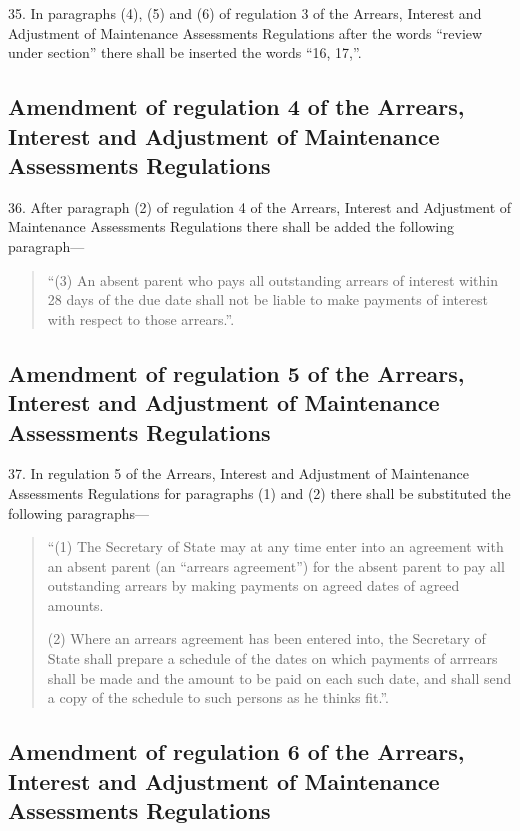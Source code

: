 \documentclass[a4paper]{article}
\begin{document}
35.  In paragraphs (4), (5) and (6) of regulation 3 of the Arrears, Interest and Adjustment of Maintenance Assessments Regulations after the words “review under section” there shall be inserted the words “16, 17,”.

\subsection[36. Amendment of regulation 4 of the Arrears, Interest and Adjustment of Maintenance Assessments Regulations]{Amendment of regulation 4 of the Arrears, Interest and Adjustment of Maintenance Assessments Regulations}

36.  After paragraph (2) of regulation 4 of the Arrears, Interest and Adjustment of Maintenance Assessments Regulations there shall be added the following paragraph---
\begin{quotation}
“(3) An absent parent who pays all outstanding arrears of interest within 28 days of the due date shall not be liable to make payments of interest with respect to those arrears.”.
\end{quotation}

\subsection[37. Amendment of regulation 5 of the Arrears, Interest and Adjustment of Maintenance Assessments Regulations]{Amendment of regulation 5 of the Arrears, Interest and Adjustment of Maintenance Assessments Regulations}

37.  In regulation 5 of the Arrears, Interest and Adjustment of Maintenance Assessments Regulations for paragraphs (1) and (2) there shall be substituted the following paragraphs---
\begin{quotation}
“(1) The Secretary of State may at any time enter into an agreement with an absent parent (an “arrears agreement”) for the absent parent to pay all outstanding arrears by making payments on agreed dates of agreed amounts.

(2) Where an arrears agreement has been entered into, the Secretary of State shall prepare a schedule of the dates on which payments of arrrears shall be made and the amount to be paid on each such date, and shall send a copy of the schedule to such persons as he thinks fit.”.
\end{quotation}

\subsection[38. Amendment of regulation 6 of the Arrears, Interest and Adjustment of Maintenance Assessments Regulations]{Amendment of regulation 6 of the Arrears, Interest and Adjustment of Maintenance Assessments Regulations}
\end{document}

